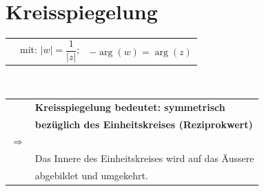 \section{Kreisspiegelung}
	\begin{minipage}[]{0.5\textwidth}
		\begin{tabular}{lll}
			\fbox{$w = \overline{f}\left( z \right) = \dfrac{1}{\overline{z}}$} &
			mit: $|w| = \dfrac{1}{\left| z \right|}$; &
			$-\operatorname{arg}\left( w \right) = \operatorname{arg}\left( z \right)$\\[3pt]
		\end{tabular}\\[3pt]
		\begin{tabular}{ll}
			 & \textbf{Kreisspiegelung bedeutet: symmetrisch}\\[3pt]
			 & \textbf{bezüglich des Einheitskreises (Reziprokwert)}\\[0.5mm]
			$\Rightarrow$ & \\[0.5mm]
			 & Das Innere des Einheitskreises wird auf das Äussere\\[3pt]
			 & abgebildet und umgekehrt.\\[3pt]
		\end{tabular}
	\end{minipage}
	\begin{minipage}[]{0.5\textwidth}
		\scalebox{0.5}{}
	\end{minipage}

